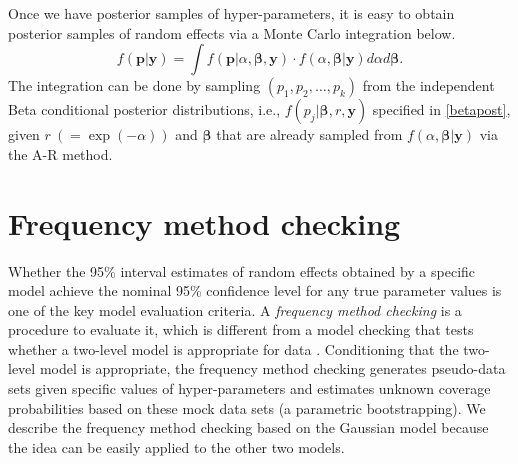\documentclass[article]{jss}
\begin{document}


Once we have posterior samples of hyper-parameters, it is easy to obtain posterior samples of random effects via a Monte Carlo integration below.
\begin{equation}\label{mcintegration}
f(\boldsymbol{p}\vert \boldsymbol{y})=\int  f(\boldsymbol{p}\vert \alpha, \boldsymbol{\beta}, \boldsymbol{y})\cdot f(\alpha, \boldsymbol{\beta}\vert \boldsymbol{y})d\alpha d\boldsymbol{\beta}.
\end{equation}
The integration can be done by sampling $(p_1, p_2, \ldots, p_k)$ from the independent Beta conditional posterior distributions, i.e., $f(p_j\vert \boldsymbol{\beta}, r, \boldsymbol{y})$ specified in  \eqref{betapost},  given $r~(=\exp(-\alpha))$ and $\boldsymbol{\beta}$ that are already sampled from $f(\alpha, \boldsymbol{\beta}\vert \boldsymbol{y})$ via the A-R method. 




\section{Frequency method checking}\label{sec4}
Whether the 95\%  interval estimates of random effects obtained by a specific model achieve the nominal 95\% confidence level  for any true parameter values is one of the key model evaluation criteria. A \emph{frequency method checking} is a procedure to evaluate it, which is different from a model checking that tests whether a two-level model is appropriate for data  \citep{dean1992testing, modelchecking1996}.   Conditioning that the two-level model is appropriate, the frequency method checking generates pseudo-data sets given specific values of hyper-parameters  and estimates unknown coverage probabilities based on these mock data sets (a parametric bootstrapping). We  describe the frequency method checking based on the Gaussian model because the idea can be easily applied to the other two models.
\end{document}
